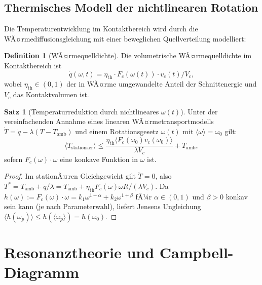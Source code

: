 ﻿\documentclass[a4paper,12pt]{article}
\theoremstyle{definition}
\newtheorem{definition}{Definition}
\newtheorem{satz}{Satz}
\begin{document}
\subsection{Thermisches Modell der nichtlinearen Rotation}
\label{sec:thermisch}

Die Temperaturentwicklung im Kontaktbereich wird durch die WÃ¤rmediffusionsgleichung
mit einer beweglichen Quellverteilung modelliert:

\begin{definition}[WÃ¤rmequelldichte]
Die volumetrische WÃ¤rmequelldichte im Kontaktbereich ist
\begin{equation}
\label{eq:waermequelle}
\dot{q}(\omega, t) = \eta_{\mathrm{th}} \cdot F_c(\omega(t)) \cdot v_c(t) / V_c,
\end{equation}
wobei $\eta_{\mathrm{th}} \in (0,1)$ der in WÃ¤rme umgewandelte Anteil der Schnittenergie
und $V_c$ das Kontaktvolumen ist.
\end{definition}

\begin{satz}[Temperaturreduktion durch nichtlineares $\omega(t)$]
\label{satz:temperatur}
Unter der vereinfachenden Annahme eines linearen WÃ¤rmetransportmodells
$\dot{T} = \dot{q} - \lambda(T - T_{\mathrm{amb}})$
und einem Rotationsgesetz $\omega(t)$ mit $\langle\omega\rangle = \omega_0$ gilt:
\[
\langle T_{\mathrm{stationaer}} \rangle \leq \frac{\eta_{\mathrm{th}} \langle F_c(\omega_0) v_c(\omega_0)\rangle}{\lambda V_c} + T_{\mathrm{amb}},
\]
sofern $F_c(\omega)\cdot\omega$ eine konkave Funktion in $\omega$ ist.
\end{satz}

\begin{proof}
Im stationÃ¤ren Gleichgewicht gilt $\dot{T} = 0$, also
$T^* = T_{\mathrm{amb}} + \dot{q}/\lambda = T_{\mathrm{amb}} + \eta_{\mathrm{th}} F_c(\omega) \omega R / (\lambda V_c)$.
Da $h(\omega) := F_c(\omega)\cdot\omega = k_1\omega^{1-\alpha} + k_2\omega^{1+\beta}$ fÃ¼r $\alpha \in (0,1)$
und $\beta > 0$ konkav sein kann (je nach Parameterwahl), liefert Jensens Ungleichung
$\langle h(\omega_p)\rangle \leq h(\langle\omega_p\rangle) = h(\omega_0)$.
\end{proof}

\section{Resonanztheorie und Campbell-Diagramm}
\label{sec:resonanz}
\end{document}
